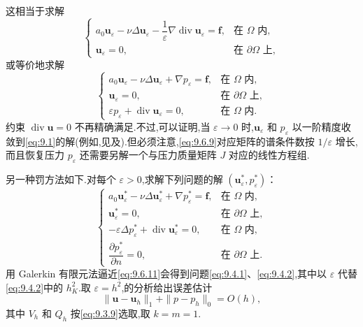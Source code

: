 这相当于求解
\begin{equation}\label{eq:9.6.9}
  \begin{cases}
    a_0\boldsymbol{u}_\varepsilon-\nu\Delta\boldsymbol{u}_\varepsilon
       -\dfrac1\varepsilon\nabla\operatorname{div}\boldsymbol{u}_\varepsilon=\boldsymbol{f},
        &\text{在 }\Omega\text{ 内},\\
    \boldsymbol{u}_\varepsilon=0,&\text{在 }\partial\Omega\text{ 上},
  \end{cases}
\end{equation}
或等价地求解
\begin{equation}\label{eq:9.6.10}
  \begin{cases}
    a_0\boldsymbol{u}_\varepsilon-\nu\Delta\boldsymbol{u}_\varepsilon+\nabla p_\varepsilon
       =\boldsymbol{f},&\text{在 }\Omega\text{ 内},\\
    \boldsymbol{u}_\varepsilon=0,&\text{在 }\partial\Omega\text{ 上},\\
    \varepsilon p_\varepsilon+\operatorname{div}\boldsymbol{u}_\varepsilon=0,
       &\text{在 }\Omega\text{ 内}.
  \end{cases}
\end{equation}
约束 \(\operatorname{div}\boldsymbol{u}=0\) 不再精确满足.不过,可以证明,当 \(\varepsilon\to0\) 时,\(\boldsymbol{u}_\varepsilon\) 和 \(p_\varepsilon\) 以一阶精度收敛到\eqref{eq:9.1}的解(例如,见及).但必须注意,\eqref{eq:9.6.9}对应矩阵的谱条件数按 \(1/\varepsilon\) 增长,而且恢复压力 \(p_\varepsilon\) 还需要另解一个与压力质量矩阵 \(J\) 对应的线性方程组.

另一种罚方法如下.对每个 \(\varepsilon>0\),求解下列问题的解 \((\boldsymbol{u}_\varepsilon^*,p_\varepsilon^*)\)：
\begin{equation}\label{eq:9.6.11}
  \begin{cases}
    a_0\boldsymbol{u}_\varepsilon^*-\nu\Delta\boldsymbol{u}_\varepsilon^*
      +\nabla p_\varepsilon^*=\boldsymbol{f},&\text{在 }\Omega\text{ 内},\\
    \boldsymbol{u}_\varepsilon^*=0,&\text{在 }\partial\Omega\text{ 上},\\
    -\varepsilon\Delta p_\varepsilon^*+\operatorname{div}\boldsymbol{u}_\varepsilon^*=0,
      &\text{在 }\Omega\text{ 内},\\
    \dfrac{\partial p_\varepsilon^*}{\partial n}=0,&\text{在 }\partial\Omega\text{ 上}.
  \end{cases}
\end{equation}
用 Galerkin 有限元法逼近\eqref{eq:9.6.11}会得到问题\eqref{eq:9.4.1}、\eqref{eq:9.4.2},其中以 \(\varepsilon\) 代替\eqref{eq:9.4.2}中的 \(h_K^2\).取 \(\varepsilon=h^2\),的分析给出误差估计
\[
  \|\boldsymbol{u}-\boldsymbol{u}_h\|_1+\|p-p_h\|_0=O(h),
\]
其中 \(V_h\) 和 \(Q_h\) 按\eqref{eq:9.3.9}选取,取 \(k=m=1\).

